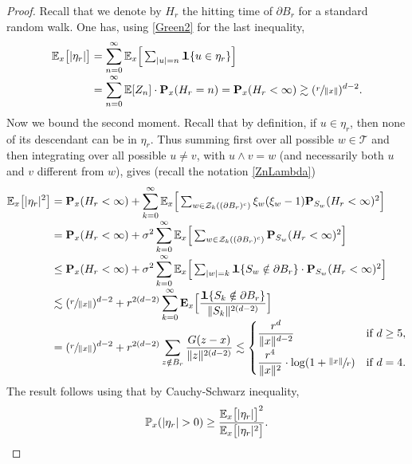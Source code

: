\documentclass[JEP,XML,SOM,Unicode,NoFloatCountersInSection,published]{cedram}
\let\ts\textstyle
\theoremstyle{plain}
\theoremstyle{definition}
\newcommand{\1}{{\text{\Large $\mathfrak 1$}}}
\begin{document}
\begin{proof}
Recall that we denote by $H_r$ the hitting time of $\partial B_r$
for a standard random walk.
One has, using \eqref{Green2} for the last inequality,\vspace*{-3pt}
\begin{align*}
\mathbb E_x\big[|\eta_r|\big] & = \sum_{n=0}^\infty
\mathbb E_x\Big[\ts\sum_{|u|=n} \1\{u \in \eta_r \}\Big]\\[-3pt]
&=
\sum_{n=0}^\infty \mathbb E[Z_n] \cdot \mathbf P_x(H_r = n)
= \mathbf P_x(H_r<\infty ) \gtrsim (\sfrac r{\|x\|})^{d-2}.
\end{align*}
Now we bound the second moment.
Recall that by definition, if $u\in \eta_r$, then none of its descendant can be in $\eta_r$. Thus summing first over all possible
$w\in \mathbf{\mathcal T}$
and then integrating over all possible $u\neq v$, with $u\wedge v=w$
(and necessarily both $u$ and $v$ different from $w$), gives (recall the notation \eqref{ZnLambda})\vspace*{-3pt}
\begin{align*}
\mathbb E_x\big[|\eta_r|^2\big] & =
\mathbf P_x(H_r<\infty) + \sum_{k=0}^\infty
\mathbb E_x \Big[\ts\sum_{w\in \mathcal Z_k((\partial B_r)^c)} \xi_w(\xi_w-1)
\mathbf P_{S_w}(H_r<\infty)^2 \Big] \\[-3pt]
& = \mathbf P_x(H_r<\infty) + \sigma^2 \sum_{k=0}^\infty
\mathbb E_x\Big[\ts\sum_{w\in \mathcal Z_k((\partial B_r)^c)} \mathbf P_{S_w}(H_r<\infty)^2 \Big] \\[-3pt]
&\le \mathbf P_x(H_r<\infty) + \sigma^2 \sum_{k=0}^\infty
\mathbb E_x \Big[\ts\sum_{|w| = k} \1\{S_w\notin \partial B_r\}\cdot
\mathbf P_{S_w}(H_r<\infty)^2 \Big]\\[-3pt]
&\lesssim (\sfrac{r}{\|x\|})^{d-2} + r^{2(d-2)}\sum_{k=0}^\infty
\mathbf E_x\Big[\frac{\1\{S_k \notin \partial B_r\}}{\|S_k\|^{2(d-2)}}\Big]\\[-5pt]
&= (\sfrac{r}{\|x\|})^{d-2} + r^{2(d-2)}\sum_{z\notin B_r} \frac{G(z-x)}{\|z\|^{2(d-2)}}\lesssim
\begin{cases}
\dfrac{r^d}{\|x\|^{d-2}} & \text{if }d\ge 5, \\[7pt]
\dfrac{r^4}{\|x\|^2} \cdot \log (1+\sfrac{\|x\|}{r}) & \text{if }d=4.
\end{cases}
\end{align*}
The result follows using that by Cauchy-Schwarz inequality,
\[
\mathbb P_x(|\eta_r|>0) \ge \frac{\mathbb E_x\big[|\eta_r|\big]^2}{\mathbb E_x\big[|\eta_r|^2\big]}.\qedhere
\]
\end{proof}
\end{document}

